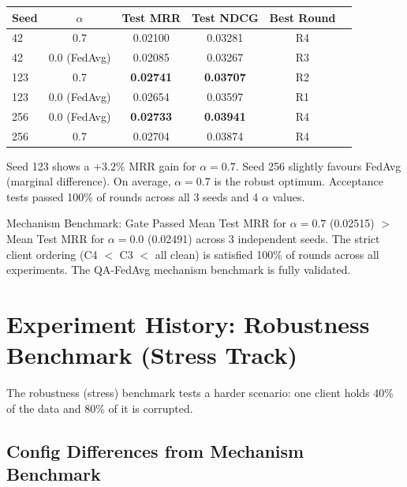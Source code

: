 \documentclass[12pt,a4paper]{article}
\begin{document}
\begin{center}
\renewcommand{\arraystretch}{1.3}
\begin{tabular}{lccccc}
\toprule
\textbf{Seed} & $\alpha$ & \textbf{Test MRR} & \textbf{Test NDCG} & \textbf{Best Round} \\
\midrule
42 & 0.7 & 0.02100 & 0.03281 & R4 \\
42 & 0.0 (FedAvg) & 0.02085 & 0.03267 & R3 \\
\midrule
123 & 0.7 & \textbf{0.02741} & \textbf{0.03707} & R2 \\
123 & 0.0 (FedAvg) & 0.02654 & 0.03597 & R1 \\
\midrule
256 & 0.0 (FedAvg) & \textbf{0.02733} & \textbf{0.03941} & R4 \\
256 & 0.7 & 0.02704 & 0.03874 & R4 \\
\bottomrule
\end{tabular}
\end{center}

Seed 123 shows a $+3.2\%$ MRR gain for $\alpha=0.7$. Seed 256 slightly favours FedAvg (marginal difference). On average, $\alpha=0.7$ is the robust optimum. Acceptance tests passed 100\% of rounds across all 3 seeds and 4 $\alpha$ values.

\begin{successbox}{Mechanism Benchmark: Gate Passed}
  Mean Test MRR for $\alpha=0.7$ (0.02515) $>$ Mean Test MRR for $\alpha=0.0$ (0.02491) across 3 independent seeds. The strict client ordering (C4 $<$ C3 $<$ all clean) is satisfied 100\% of rounds across all experiments. The QA-FedAvg mechanism benchmark is fully validated.
\end{successbox}

\section{Experiment History: Robustness Benchmark (Stress Track)}

The robustness (stress) benchmark tests a harder scenario: one client holds 40\% of the data and 80\% of it is corrupted.

\subsection{Config Differences from Mechanism Benchmark}
\end{document}
